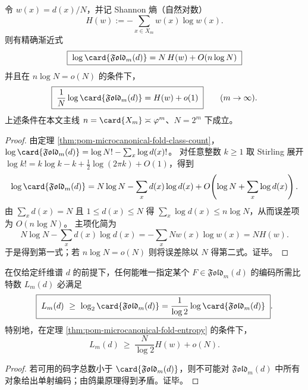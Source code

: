 \begin{theorem}\label{thm:pom-microcanonical-fold-entropy}
令 \(w(x)=d(x)/N\)，并记 Shannon 熵（自然对数）
\[
H(w):=-\sum_{x\in X_m} w(x)\log w(x).
\]
则有精确渐近式
\[
\boxed{\;
\log\card{\mathfrak{Fold}_m(d)}=N\,H(w)+O(n\log N)\;}
\]
并且在 \(n\log N=o(N)\) 的条件下，
\[
\boxed{\;
\frac{1}{N}\log\card{\mathfrak{Fold}_m(d)}=H(w)+o(1)\;}
\qquad(m\to\infty).
\]
上述条件在本文主线 \(n=\card{X_m}\asymp \varphi^m\)、\(N=2^m\) 下成立。
\end{theorem}
\begin{proof}
由定理 \ref{thm:pom-microcanonical-fold-class-count}，
\(
\log\card{\mathfrak{Fold}_m(d)}=\log N!-\sum_x\log d(x)!
\)。
对任意整数 \(k\ge 1\) 取 Stirling 展开
\(
\log k!=k\log k-k+\tfrac12\log(2\pi k)+O(1)
\)，得到
\[
\log\card{\mathfrak{Fold}_m(d)}
=N\log N-\sum_x d(x)\log d(x)+O\!\left(\log N+\sum_x\log d(x)\right).
\]
由 \(\sum_x d(x)=N\) 且 \(1\le d(x)\le N\) 得 \(\sum_x\log d(x)\le n\log N\)，从而误差项为 \(O(n\log N)\)。
主项化简为
\[
N\log N-\sum_x d(x)\log d(x)
=-\sum_x Nw(x)\log w(x)
=N H(w).
\]
于是得到第一式；若 \(n\log N=o(N)\) 则将误差除以 \(N\) 得第二式。证毕。
\end{proof}

\begin{corollary}\label{cor:pom-microcanonical-fold-description-length-lower-bound}
在仅给定纤维谱 \(d\) 的前提下，任何能唯一指定某个 \(F\in\mathfrak{Fold}_m(d)\) 的编码所需比特数 \(L_m(d)\) 必满足
\[
\boxed{\;
L_m(d)\ \ge\ \log_2\card{\mathfrak{Fold}_m(d)}
=\frac{1}{\log 2}\log\card{\mathfrak{Fold}_m(d)}\; } .
\]
特别地，在定理 \ref{thm:pom-microcanonical-fold-entropy} 的条件下，
\[
L_m(d)\ \ge\ \frac{N}{\log 2}H(w)+o(N).
\]
\end{corollary}
\begin{proof}
若可用的码字总数小于 \(\card{\mathfrak{Fold}_m(d)}\)，则不可能对 \(\mathfrak{Fold}_m(d)\) 中所有对象给出单射编码；由鸽巢原理得到矛盾。证毕。
\end{proof}

